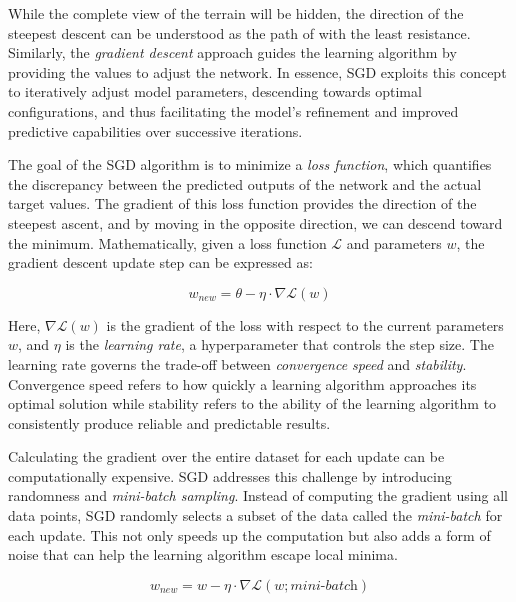 While the complete view of the terrain will be hidden, the direction of the steepest descent can be understood as the path of with the least resistance. Similarly, the \textit{gradient descent} approach guides the learning algorithm by providing the values to adjust the network. In essence, SGD exploits this concept to iteratively adjust model parameters, descending towards optimal configurations, and thus facilitating the model's refinement and improved predictive capabilities over successive iterations.

The goal of the SGD algorithm is to minimize a \textit{loss function}, which quantifies the discrepancy between the predicted outputs of the network and the actual target values. The gradient of this loss function provides the direction of the steepest ascent, and by moving in the opposite direction, we can descend toward the minimum. Mathematically, given a loss function $\mathcal{L}$ and parameters $w$, the gradient descent update step can be expressed as:

\begin{equation}
    w_{new} = \theta - \eta \cdot \nabla \mathcal{L}(w)
\end{equation}

Here, $\nabla \mathcal{L}(w)$ is the gradient of the loss with respect to the current parameters $w$, and $\eta$ is the \textit{learning rate}, a hyperparameter that controls the step size. The learning rate governs the trade-off between \textit{convergence speed} and \textit{stability}. Convergence speed refers to how quickly a learning algorithm approaches its optimal solution while stability refers to the ability of the learning algorithm to consistently produce reliable and predictable results.

Calculating the gradient over the entire dataset for each update can be computationally expensive. SGD addresses this challenge by introducing randomness and \textit{mini-batch sampling}. Instead of computing the gradient using all data points, SGD randomly selects a subset of the data called the \textit{mini-batch} for each update. This not only speeds up the computation but also adds a form of noise that can help the learning algorithm escape local minima.

\begin{equation}
    w_{new} = w - \eta \cdot \nabla \mathcal{L}(w; \textit{mini-batch})
\end{equation}


